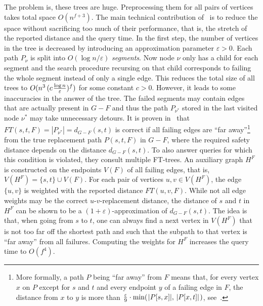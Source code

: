 \documentclass{theoretics}
\newcommand*{\nwspace}{\hspace*{.1em}}
\newcommand{\eps}{\varepsilon}
\begin{document}
The problem is, these trees are huge.
Preprocessing them for all pairs of vertices takes total space $O(n^{f+3})$.
The main technical contribution of~\cite{ChCoFiKa17} is to reduce the space without sacrificing too much of their performance,
that is, the stretch of the reported distance and the query time.
%
In the first step, the number of vertices in the tree is decreased
by introducing an approximation parameter $\eps > 0$.
Each path $P_\nu$ is split into $O(\log n/\eps)$ \emph{segments}.
Now node $\nu$ only has a child for each segment and the search procedure recursing 
on that child corresponds to failing the whole segment instead of only a single edge.
This reduces the total size of all trees to $O(n^3 \, (c \nwspace \frac{\log n}{\eps})^f)$
for some constant $c > 0$.
However, it leads to some inaccuracies in the answer of the tree.
The failed segments may contain edges that are actually present in $G-F$
and thus the path $P_{\nu^*}$ stored in the last visited node $\nu^*$ may take unnecessary detours.
It is proven in~\cite{ChCoFiKa17} that $FT(s,t,F) = |P_{\nu^*}| = d_{G-F}(s,t)$
is correct if all failing edges are ``far away''\footnote{%
  More formally, a path $P$ being ``far away'' from $F$ means that,
  for every vertex $x$ on $P$ except for $s$ and $t$ 
  and every endpoint $y$ of a failing edge in $F$,
  the distance from $x$ to $y$ is more than
  $\frac{\eps}{9} \cdot \min(\nwspace |P[s,x]|,\, |P[x,t]| \nwspace )$,
  see~.
}
from the true replacement path $P(s,t,F)$ in $G-F$,
where the required safety distance depends on the distance $d_{G-F}(s,t)$.
To also answer queries for which this condition is violated,
they consult multiple FT-trees.
An auxiliary graph $H^F$ is constructed on the endpoints $V(F)$
of all failing edges, that is, $V(H^F) = \{s,t\} \cup V(F)$.
For each pair of vertices $u,v \in V(H^F)$, the edge $\{u,v\}$ is weighted
with the reported distance $FT(u,v,F)$.
While not all edge weights may be the correct $u$-$v$-replacement distance,
the distance of $s$ and $t$ in $H^F$ can be shown 
to be a $(1{+}\eps)$-approximation of $d_{G-F}(s,t)$.
The idea is that, when going from $s$ to $t$, one can always find a next vertex in $V(H^F)$
that is not too far off the shortest path and
such that the subpath to that vertex is ``far away'' from all failures.
Computing the weights for $H^F$ increases the query time to $O(f^4)$.
\end{document}
